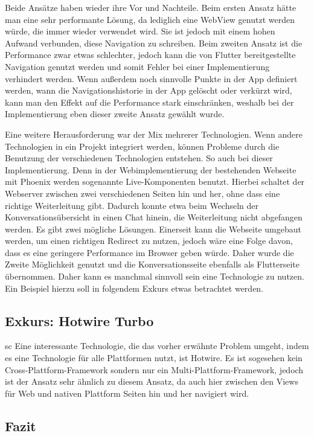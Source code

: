 Beide Ansätze haben wieder ihre Vor und Nachteile. Beim ersten Ansatz hätte man eine sehr performante Lösung, da lediglich eine WebView genutzt werden würde, die immer wieder verwendet wird. Sie ist jedoch mit einem hohen Aufwand verbunden, diese Navigation zu schreiben. Beim zweiten Ansatz ist die Performance zwar etwas schlechter, jedoch kann die von Flutter bereitgestellte Navigation genutzt werden und somit Fehler bei einer Implementierung verhindert werden. Wenn außerdem noch sinnvolle Punkte in der App definiert werden, wann die Navigationshistorie in der App gelöscht oder verkürzt wird, kann man den Effekt auf die Performance stark einschränken, weshalb bei der Implementierung eben dieser zweite Ansatz gewählt wurde. 

Eine weitere Herausforderung war der Mix mehrerer Technologien. Wenn andere Technologien in ein Projekt integriert werden, können Probleme durch die Benutzung der verschiedenen Technologien entstehen. So auch bei dieser Implementierung. Denn in der Webimplementierung der bestehenden Webseite mit Phoenix werden sogenannte Live-Komponenten benutzt. Hierbei schaltet der Webserver zwischen zwei verschiedenen Seiten hin und her, ohne dass eine richtige Weiterleitung gibt. Dadurch konnte etwa beim Wechseln der Konversationsübersicht in einen Chat hinein, die Weiterleitung nicht abgefangen werden. Es gibt zwei mögliche Lösungen. Einerseit kann die Webseite umgebaut werden, um einen richtigen Redirect zu nutzen, jedoch wäre eine Folge davon,  dass es eine geringere Performance im Browser geben würde. Daher wurde die Zweite Möglichkeit genutzt und die Konversationsseite ebenfalls als Flutterseite übernommen. Daher kann es manchmal sinnvoll sein eine Technologie zu nutzen. Ein Beispiel hierzu soll in folgendem Exkurs etwas betrachtet werden.



\subsection{Exkurs: Hotwire Turbo}
sc
Eine interessante Technologie, die das vorher erwähnte Problem umgeht, indem es eine Technologie für alle Plattformen nutzt, ist Hotwire. Es ist sogesehen kein Cross-Plattform-Framework sondern nur ein Multi-Plattform-Framework, jedoch ist der Ansatz sehr ähnlich zu diesem Ansatz, da auch hier zwischen den Views für Web und nativen Plattform Seiten hin und her navigiert wird. 
\subsection{Fazit}